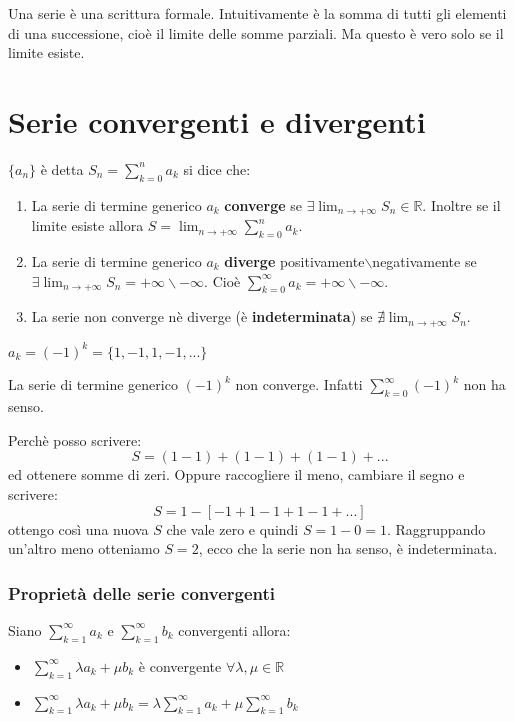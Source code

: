 \begin{definition*}[Serie]
    Una serie è una scrittura formale. Intuitivamente è la somma di tutti gli elementi di una successione, cioè il limite delle somme parziali. Ma questo è vero solo se il limite esiste.
\end{definition*}

\chapter{Serie convergenti e divergenti}
\begin{definition*}
    $\{a_n\}$ è detta $S_n=\sum^n_{k=0}a_k$ si dice che:
    \begin{enumerate}
        \item La serie di termine generico $a_k$ \textbf{converge} se $\exists\lim_{n\to+\infty}S_n\in\mathbb{R}$. Inoltre se il limite esiste allora $S=\lim_{n\to+\infty}\sum^n_{k=0}a_k$.
        \item La serie di termine generico $a_k$ \textbf{diverge} positivamente$\backslash$negativamente se $\exists\lim_{n\to+\infty}S_n=+\infty\backslash-\infty$. Cioè $\sum^\infty_{k=0}a_k=+\infty\backslash-\infty$.
        \item La serie non converge nè diverge (è \textbf{indeterminata}) se $\nexists\lim_{n\to+\infty}S_n$.
    \end{enumerate}
\end{definition*}
    
\begin{example}
    $a_k=(-1)^k=\{1,-1,1,-1,...\}$
    
    La serie di termine generico $(-1)^k$ non converge. Infatti $\sum^\infty_{k=0}(-1)^k$ non ha senso.
    
    Perchè posso scrivere:
    \begin{equation*}S=(1-1)+(1-1)+(1-1)+...\end{equation*} 
    ed ottenere somme di zeri. Oppure raccogliere il meno, cambiare il segno e scrivere:
    \begin{equation*}S=1-[-1+1-1+1-1+...]\end{equation*}
    ottengo così una nuova $S$ che vale zero e quindi $S=1-0=1$. Raggruppando un'altro meno otteniamo $S=2$, ecco che la serie non ha senso, è indeterminata.
\end{example}

\subsection*{Proprietà delle serie convergenti}
Siano $\sum^\infty_{k=1}a_k$ e $\sum^\infty_{k=1}b_k$ convergenti allora:
\begin{itemize}
    \item $\sum^\infty_{k=1}\lambda a_k+\mu b_k$ è convergente $\forall\lambda, \mu\in\mathbb{R}$
    \item $\sum^\infty_{k=1}\lambda a_k+\mu b_k=\lambda\sum^\infty_{k=1}a_k+\mu\sum^\infty_{k=1}b_k$
\end{itemize}

